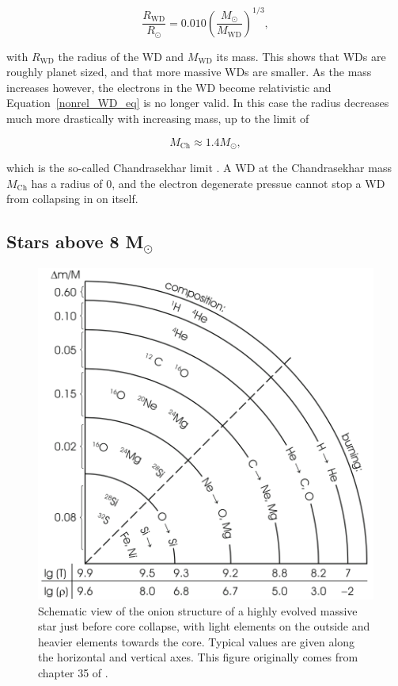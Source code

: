 \documentclass[a4paper,oneside,12pt, class=Latex/Classes/PhDthesisPSnPDF, crop=false]{standalone}
\begin{document}
\begin{equation}
    \label{nonrel_WD_eq}
    \frac{R_\text{WD}}{R_\odot} = 0.010 \left(\frac{M_\odot}{M_\text{WD}}\right)^{1/3},
\end{equation}

with $R_\text{WD}$ the radius of the WD and $M_\text{WD}$ its mass. This shows that WDs are roughly planet sized, and that more massive WDs are smaller. As the mass increases however, the electrons in the WD become relativistic and Equation~\ref{nonrel_WD_eq} is no longer valid. In this case the radius decreases much more drastically with increasing mass, up to the limit of 

\begin{equation}
    \label{Chandrasekhar_lim}
    M_\text{Ch} \approx 1.4 M_\odot,
\end{equation}

which is the so-called Chandrasekhar limit \citep{Chandrasekhar_lim}. A WD at the Chandrasekhar mass $M_\text{Ch}$ has a radius of 0, and the electron degenerate pressue cannot stop a WD from collapsing in on itself.


\subsection{Stars above 8 M$_\odot$}
\label{ge_8_Msol}

\begin{figure}
    \centering
    \includegraphics[width=\textwidth]{../Images/chapter_1/starstruct.png}
    \caption{Schematic view of the onion structure of a highly evolved massive star just before core collapse, with light elements on the outside and heavier elements towards the core. Typical values are given along the horizontal and vertical axes. This figure originally comes from chapter 35 of \citet{starstruct}.}
    \label{startstruct}
\end{figure}
\end{document}
